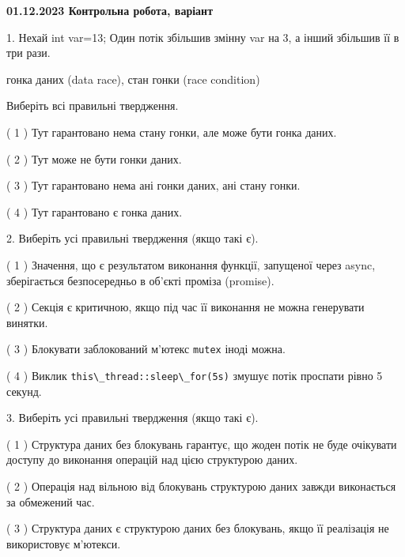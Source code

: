 \documentclass[12pt, ukrainian]{article}
\def\code#1{\Verb!#1!}
\begin{document}
\vspace{4mm}
\newpage
\begin {large}

\textbf{01.12.2023 Контрольна робота, варіант  }\par


{
1. Нехай int var=13; Один потік збільшив змінну var на 3, а інший збільшив її в три рази.

гонка даних (data race), стан гонки (race condition)

Виберіть всі правильні твердження.\par
\vspace{2mm}
( 1 ) Тут гарантовано нема стану гонки, але може бути гонка даних.%

( 2 ) Тут може не бути гонки даних.%

( 3 ) Тут гарантовано нема ані гонки даних, ані стану гонки.%

( 4 ) Тут гарантовано є гонка даних.%


\vspace{5mm}
2. Виберіть усі правильні твердження (якщо такі є).\par
\vspace{2mm}

( 1 ) Значення, що є результатом виконання функції, запущеної через async, зберігається безпосередньо в об’єкті проміза (promise).%

( 2 ) Секція є критичною, якщо під час її виконання не можна генерувати винятки.%

( 3 ) Блокувати заблокований м’ютекс  \code{mutex} іноді можна.%

( 4 ) Виклик \code{this\_thread::sleep\_for(5s)} змушує потік проспати рівно 5 секунд.%


\vspace{5mm}
3. Виберіть усі правильні твердження (якщо такі є).\par
\vspace{2mm}

( 1 ) Структура даних без блокувань гарантує, що жоден потік не буде очікувати доступу до виконання операцій над цією структурою даних.%

( 2 ) Операція над вільною від блокувань структурою даних завжди виконається за обмежений час.%

( 3 ) Структура даних є структурою даних без блокувань, якщо її реалізація не використовує м’ютекси.%

}
\end{large}
\end{document}
